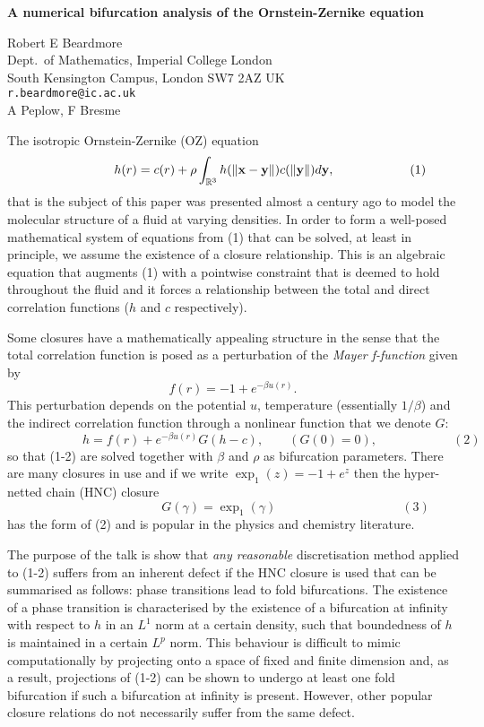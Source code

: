 \documentclass{report}
\begin{document}

\begin{center}
{\large
{\bf A numerical bifurcation analysis of the Ornstein-Zernike equation}}

	Robert E Beardmore \\
	Dept.~of Mathematics, Imperial College London \\
	South Kensington Campus,  London SW7 2AZ UK \\
	{\tt r.beardmore@ic.ac.uk} \\
	A Peplow, F Bresme
\end{center}
The isotropic Ornstein-Zernike (OZ) equation
$$
\qquad
\qquad
\qquad
h(r) = c(r) + \rho \int_{\mathbb{R}^{3}}
h(\|{\bf x}-{\bf y}\|)c(\|{\bf y}\|)d{\bf y},
\qquad
\qquad
\qquad
(1)
$$
that is the subject of this
paper was presented almost a century ago to model the
molecular structure of a fluid at varying densities. In
order to form a well-posed mathematical system of equations
from (1) that can be solved, at least in
principle, we assume the existence of a closure
relationship. This is an algebraic equation that augments
(1) with a pointwise constraint that is deemed to
hold throughout the fluid and it forces a relationship
between the total and direct correlation functions ($h$ and
$c$ respectively).

Some closures have a mathematically
appealing structure in the sense that the total correlation
function is posed as a perturbation of the {\em Mayer
f-function} given by \[ f(r)=-1+e^{-\beta u(r)}.\] This
perturbation depends on the potential $u$, temperature
(essentially $1/\beta$) and the indirect correlation
function through a nonlinear function that we denote $G$:
$$
\qquad
\qquad
\qquad
h = f(r) + e^{-\beta u(r)}G(h-c),
\qquad
(G(0)= 0),
\qquad
\qquad
\qquad
(2)
$$
so that (1-2) are solved together with $\beta$
and $\rho$ as bifurcation parameters. There are many
closures in use and if we write $\exp_1(z) = -1+e^z$ then
the hyper-netted chain (HNC) closure
$$
\qquad
\qquad
\qquad
\qquad
\qquad
G(\gamma) = \exp_1(\gamma)
\qquad
\qquad
\qquad
\qquad
\qquad
(3)
$$
has the form of
(2) and is popular in the physics and chemistry
literature.

The purpose of the talk is show that {\em any
reasonable} discretisation method applied to
(1-2) suffers from an inherent defect if
the HNC closure is used that can be summarised as follows:
phase transitions lead to fold bifurcations. The existence
of a phase transition is characterised by the existence of a
bifurcation at infinity with respect to $h$ in an $L^1$ norm
at a certain density, such that boundedness of $h$ is
maintained in a certain $L^p$ norm. This behaviour is
difficult to mimic computationally by projecting onto a
space of fixed and finite dimension and, as a result,
projections of (1-2) can be shown to
undergo at least one fold bifurcation if such a bifurcation
at infinity is present. However, other popular closure
relations do not necessarily suffer from the same defect.



\end{document}
